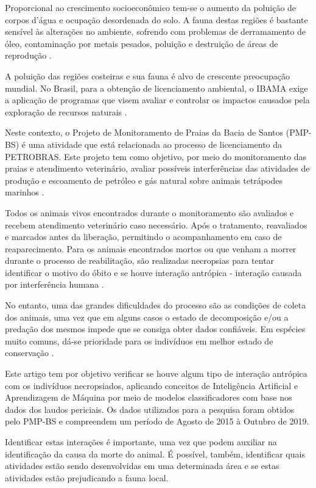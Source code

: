 \documentclass[12pt]{article}
\begin{document}
Proporcional ao crescimento socioeconômico tem-se o aumento da poluição de corpos d'água e ocupação desordenada do solo. A fauna destas regiões é bastante sensível às alterações no ambiente, sofrendo com problemas de derramamento de óleo, contaminação por metais pesados, poluição e destruição de áreas de reprodução \cite{mma:zcmu,scherer:litoral}.

A poluição das regiões costeiras e sua fauna é alvo de crescente preocupação mundial. No Brasil, para a obtenção de licenciamento ambiental, o IBAMA exige a aplicação de programas que visem avaliar e controlar os impactos causados pela exploração de recursos naturais \cite{mma:pngc, petrobras:pmp}. 

Neste contexto, o Projeto de Monitoramento de Praias da Bacia de Santos (PMP-BS) é uma atividade que está relacionada ao processo de licenciamento da PETROBRAS. Este projeto tem como objetivo, por meio do monitoramento das praias e atendimento veterinário, avaliar possíveis interferências das atividades de produção e escoamento de petróleo e gás natural sobre animais tetrápodes marinhos \cite{univali:pmp,petrobras:anual1}.

Todos os animais vivos encontrados durante o monitoramento são avaliados e recebem atendimento veterinário caso necessário. Após o tratamento, reavaliados e marcados antes da liberação, permitindo o acompanhamento em caso de reaparecimento. Para os animais encontrados mortos ou que venham a morrer durante o processo de reabilitação, são realizadas necropsias para tentar identificar o motivo do óbito e se houve interação antrópica - interação causada por interferência humana \cite{univali:pmp, petrobras:anual1}.

No entanto, uma das grandes dificuldades do processo são as condições de coleta dos animais, uma vez que em alguns casos o estado de decomposição e/ou a predação dos mesmos impede que se consiga obter dados confiáveis. Em espécies muito comuns, dá-se prioridade para os indivíduos em melhor estado de conservação \cite{petrobras:pmp, petrobras:anual1}.

Este artigo tem por objetivo verificar se houve algum tipo de interação antrópica com os indivíduos necropsiados, aplicando conceitos de Inteligência Artificial e Aprendizagem de Máquina por meio de modelos classificadores com base nos dados dos laudos periciais. Os dados utilizados para a pesquisa foram obtidos pelo PMP-BS e compreendem um período de Agosto de 2015 à Outubro de 2019.

Identificar estas interações é importante, uma vez que podem auxiliar na identificação da causa da morte do animal. É possível, também, identificar quais atividades estão sendo desenvolvidas em uma determinada área e se estas atividades estão prejudicando a fauna local.
\end{document}
